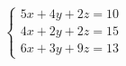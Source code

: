 \documentclass[preview]{standalone}
\begin{document}
\begin{align*}
\begin{cases} 5x + 4y + 2z = 10 \\ 4x + 2y + 2z = 15 \\ 6x + 3y + 9z = 13 \end{cases}
\end{align*}
\end{document}
